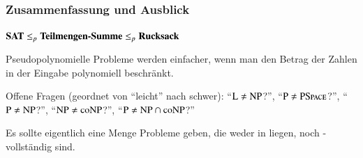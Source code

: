 \documentclass[aspectratio=1610,onlymath]{beamer}
\begin{document}
\begin{frame}\frametitle{Zusammenfassung und Ausblick}

$\textbf{\textcolor{black}{SAT}}\leq_p\textbf{\textcolor{black}{Teilmengen-Summe}}\leq_p \textbf{\textcolor{black}{Rucksack}}$
\bigskip

Pseudopolynomielle Probleme werden einfacher, wenn man den Betrag der Zahlen in der Eingabe polynomiell beschränkt.\bigskip

Offene Fragen (geordnet von "`leicht"' nach schwer):
"`${\textsc{L}}\neq{\textsc{NP}}$?"',
"`${\textsc{P}}\neq{\textsc{PSpace}}$?"',
"`${\textsc{P}}\neq{\textsc{NP}}$?"',
"`${\textsc{NP}}\neq{\textsc{coNP}}$?"',
"`${\textsc{P}}\neq {\textsc{NP}}\cap{\textsc{coNP}}$?"'
\bigskip

Es sollte eigentlich eine Menge Probleme geben, die weder in  liegen, noch -vollständig sind.\bigskip


\end{frame}



% 
% 
% 
% 
% 
% 
\end{document}
